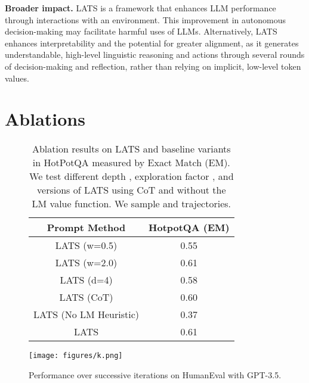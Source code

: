 \documentclass{article} \usepackage{iclr2024_conference,times}
\begin{document}
\textbf{Broader impact.} LATS is a framework that enhances LLM performance through interactions with an environment. This improvement in autonomous decision-making may facilitate harmful uses of LLMs. Alternatively, LATS enhances interpretability and the potential for greater alignment, as it generates understandable, high-level linguistic reasoning and actions through several rounds of decision-making and reflection, rather than relying on implicit, low-level token values.
{
\section{Ablations}\label{sec:abl}

\begin{figure}[t]
   
    \centering
    \begin{minipage}{.48\textwidth}
        \centering
        \begin{table}[H]
            \begin{tabular}{c|c}
                \toprule
                \textbf{Prompt Method} & \textbf{HotpotQA (EM)} \\
                \midrule
                LATS (w=0.5) & 0.55 \\
                LATS (w=2.0) & 0.61 \\
                LATS (d=4) & 0.58 \\
                LATS (CoT) & 0.60 \\
                LATS (No LM Heuristic) & 0.37 \\
                LATS & 0.61 \\ 
                \bottomrule
            \end{tabular}
    \caption{Ablation results on LATS and baseline variants in HotPotQA measured by Exact Match (EM). We test different depth , exploration factor , and versions of LATS using CoT and without the LM value function. We sample  and  trajectories.}
        \end{table}

        \label{tab:hotpotqa}
    \end{minipage}\hspace{4pt}
    \begin{minipage}{.48\textwidth}
        \centering
         \texttt{[image: figures/k.png]}
        \vspace{-0.1in}
        \caption{ Performance over successive iterations on HumanEval with GPT-3.5.}
        \label{fig:k}
    \end{minipage}
\end{figure}


}
\end{document}
